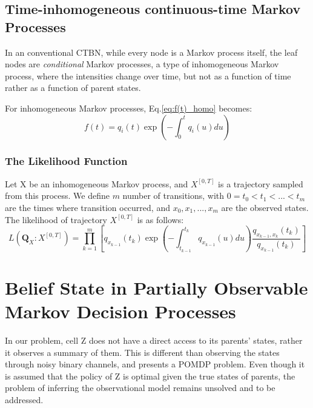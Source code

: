 \subsection{Time-inhomogeneous continuous-time Markov Processes}
In an conventional CTBN, while every node is a Markov process itself, the leaf nodes are \textit{conditional} Markov processes, a type of inhomogeneous Markov process, where the intensities change over time, but not as a function of time rather as a function of parent states. \cite{Nodelman1995} %
 
For inhomogeneous Markov processes, Eq.\ref{eq:f(t)_homo} becomes:
\begin{equation}
f(t) = q_{i}(t) \exp \left(-\int_{0}^{t} q_{i}(u) d u\right)
\end{equation}
\subsubsection{The Likelihood Function}
Let X be an inhomogeneous Markov process, and $  X^{\left[0,T\right] } $ is a trajectory sampled from this process. We define $ m $ number of transitions, with $ 0 = t_{0} < t_{1} < ... < t_{m} $ are the times where transition occurred, and $ x_{0}, x_{1},..., x_{m} $ are the observed states. The likelihood of trajectory  $  X^{\left[0,T\right] } $ is  as follows: 
\begin{equation}
L(\textbf{Q}_{X} \colon  X^{\left[0,T\right]} ) = \prod_{k=1}^{m} \left[ q_{x_{k-1}} (t_{k}) \exp \left(-\int_{t_{k-1}}^{t_{k}} q_{x_{k-1}}(u) d u\right) \frac{q_{x_{k-1}, x_{k}} (t_{k})}{q_{x_{k-1}}(t_{k})}\right] 
\label{eq:lh_traj_inhomo}
\end{equation}


\section{Belief State in Partially Observable Markov Decision Processes}
In our problem, cell Z does not have a direct access to its parents' states, rather it observes a summary of them. This is different than observing the states through noisy binary channels, and presents a POMDP problem. Even though it is assumed that the policy of Z is optimal given the true states of parents, the problem of inferring the observational model remains unsolved and to be addressed.

